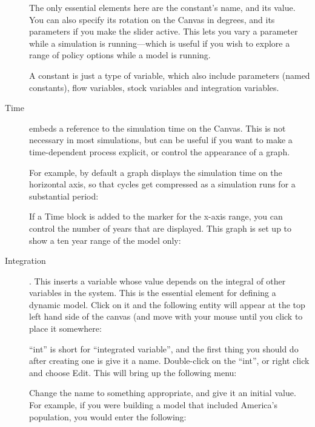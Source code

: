 \begin{description}
The only essential elements here are the constant's name, and its
value. You can also specify its rotation on the Canvas in degrees, and
its parameters if you make the slider active. This lets you vary a
parameter while a simulation is running---which is useful if you wish
to explore a range of policy options while a model is running.

A constant is just a type of variable, which also include parameters
(named constants), flow variables, stock variables and integration variables.

\item[Time]  embeds a reference to the
simulation time on the Canvas. This is not necessary in most
simulations, but can be useful if you want to make a time-dependent
process explicit, or control the appearance of a graph. 

For example, by default a graph displays the simulation time on the
horizontal axis, so that cycles get compressed as a simulation runs
for a substantial period:


If a Time block is added to the marker for the x-axis range, you can
control the number of years that are displayed. This graph is set up
to show a ten year range of the model only: 




\item[Integration] .\label{Integrate}
  This inserts a variable whose value depends on the integral of other
  variables in the system. This is the essential element for defining
  a dynamic model. Click on it and the following entity will appear at
  the top left hand side of the canvas (and move with your mouse until
  you click to place it somewhere:



``int'' is short for ``integrated variable'', and the first thing you should do after creating one is give it a name. Double-click on the ``int'', or right click and choose Edit. This will bring up the following menu:


Change the name to something appropriate, and give it an initial
value. For example, if you were building a model that included
America's population, you would enter the following:




\end{description}
